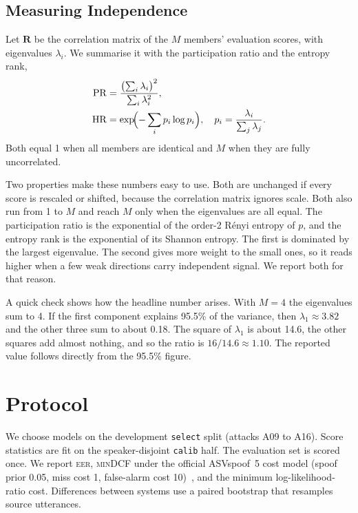 \documentclass[twocolumn,a4paper,11pt]{article}
\newcommand{\eer}{\textsc{eer}}
\newcommand{\mindcf}{\textsc{minDCF}}
\newcommand{\PR}{\ensuremath{\mathrm{PR}}}
\newcommand{\HR}{\ensuremath{\mathrm{HR}}}
\begin{document}
\subsection{Measuring Independence}
\label{sec:metrics}

Let $\mathbf{R}$ be the correlation matrix of the $M$ members' evaluation
scores, with eigenvalues $\lambda_i$. We summarise it with the participation
ratio and the entropy rank,
\begin{align}
\PR &= \frac{\bigl(\sum_i \lambda_i\bigr)^2}{\sum_i \lambda_i^2},
\label{eq:pr}\\
\HR &= \exp\!\Bigl(-\sum_i p_i \log p_i\Bigr),\quad
  p_i = \frac{\lambda_i}{\sum_j \lambda_j}.
\label{eq:hr}
\end{align}
Both equal 1 when all members are identical and $M$ when they are fully
uncorrelated.

Two properties make these numbers easy to use. Both are unchanged if every
score is rescaled or shifted, because the correlation matrix ignores scale.
Both also run from 1 to $M$ and reach $M$ only when the eigenvalues are all
equal. The participation ratio is the exponential of the order-2 R\'enyi
entropy of $p$, and the entropy rank is the exponential of its Shannon
entropy. The first is dominated by the largest eigenvalue. The second gives
more weight to the small ones, so it reads higher when a few weak directions
carry independent signal. We report both for that reason.

A quick check shows how the headline number arises. With $M{=}4$ the
eigenvalues sum to 4. If the first component explains 95.5\% of the variance,
then $\lambda_1 \approx 3.82$ and the other three sum to about 0.18. The
square of $\lambda_1$ is about 14.6, the other squares add almost nothing, and
so the ratio is $16/14.6 \approx 1.10$. The reported value follows directly
from the 95.5\% figure.

\section{Protocol}
\label{sec:protocol}

We choose models on the development \texttt{select} split (attacks A09 to
A16). Score statistics are fit on the speaker-disjoint \texttt{calib} half.
The evaluation set is scored once. We report \eer{}, \mindcf{} under the
official ASVspoof~5 cost model (spoof prior 0.05, miss cost 1, false-alarm
cost 10)~\cite{asvspoof5,tdcf}, and the minimum log-likelihood-ratio cost.
Differences between systems use a paired bootstrap that resamples source
utterances.
\end{document}
